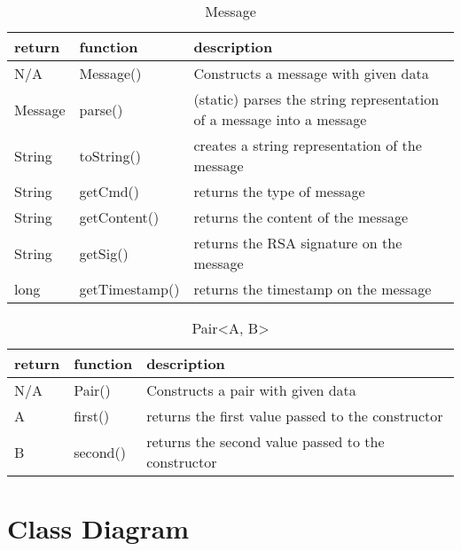 \begin{table}[h]
    \centering
    \begin{tabular}{p{1cm}p{2.6cm}p{9cm}}
    return  & function       & description\\ \hline
    N/A     & Message()      & Constructs a message with given data\\
    
    Message & parse()        & (static) parses the string representation of a message into a message\\
    
    String  & toString()     & creates a string representation of the message\\
    String  & getCmd()       & returns the type of message\\
    String  & getContent()   & returns the content of the message\\
    String  & getSig()       & returns the RSA signature on the message\\
    long    & getTimestamp() & returns the timestamp on the message\\
    \end{tabular}
    \caption{Message}
\end{table}

\begin{table}[h]
    \centering
    \begin{tabular}{p{1cm}p{2cm}p{9cm}}
    return & function & description\\ \hline
    
    N/A    & Pair()   & Constructs a pair with given data\\
    A      & first()  & returns the first value passed to the constructor\\
    B      & second() & returns the second value passed to the constructor\\
    \end{tabular}
    \caption{Pair\textless A, B\textgreater }
\end{table}

\section{Class Diagram}
